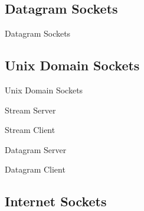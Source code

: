 \subsection{Datagram Sockets}
\label{sec:datagram-sockets}

\begin{frame}{Datagram Sockets}
  \centering%
  \mode<beamer>{ \texttt{[image: socket-datagram]} }%
\end{frame}

\subsection{Unix Domain Sockets}
\label{sec:unix-domain-sockets}

\begin{frame}{Unix Domain Sockets}
\begin{center}
\end{center}
\end{frame}

\begin{frame}{Stream Server}
  \centering
\end{frame}

\begin{frame}{Stream Client}
\end{frame}

\begin{frame}{Datagram Server}
\end{frame}

\begin{frame}{Datagram Client}
\end{frame}

\subsection{Internet Sockets}
\label{sec:internet-sockets}

